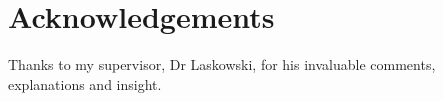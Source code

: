 \section*{Acknowledgements}
Thanks to my supervisor, Dr Laskowski, for his invaluable comments, explanations and insight.

